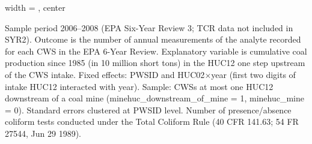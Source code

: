 \begin{table}[htbp]
\begin{adjustbox}{width = \textwidth, center}
      
   \end{adjustbox}
      {\tiny\linespread{1}\selectfont \par \raggedright 
   Sample period 2006--2008 (EPA Six-Year Review 3; TCR data not included in SYR2). Outcome is the number of annual measurements of the analyte recorded for each CWS in the EPA 6-Year Review. Explanatory variable is cumulative coal production since 1985 (in 10 million short tons) in the HUC12 one step upstream of the CWS intake. Fixed effects: PWSID and HUC02$\times$year (first two digits of intake HUC12 interacted with year). Sample: CWSs at most one HUC12 downstream of a coal mine (minehuc\_downstream\_of\_mine = 1, minehuc\_mine = 0). Standard errors clustered at PWSID level. Number of presence/absence coliform tests conducted under the Total Coliform Rule (40 CFR 141.63; 54 FR 27544, Jun 29 1989).}
   
\end{table}


